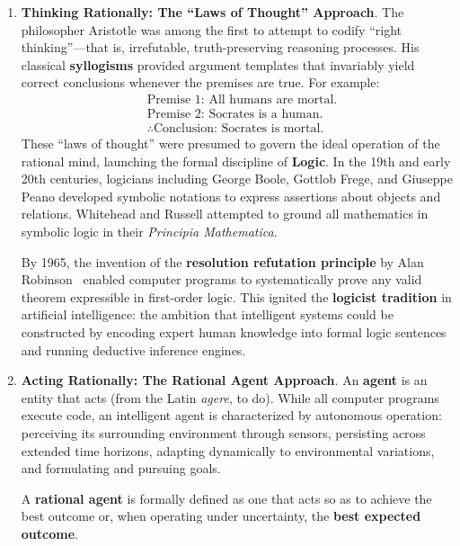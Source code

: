 \begin{enumerate}
  \item \textbf{Thinking Rationally: The ``Laws of Thought'' Approach}.
  The philosopher Aristotle was among the first to attempt to codify ``right thinking''---that is, irrefutable, truth-preserving reasoning processes. His classical \textbf{syllogisms} provided argument templates that invariably yield correct conclusions whenever the premises are true. For example:
  \begin{equation}
  \begin{aligned}
  &\text{Premise 1: All humans are mortal.} \\
  &\text{Premise 2: Socrates is a human.} \\
  &\therefore \text{Conclusion: Socrates is mortal.}
  \end{aligned}
  \end{equation}
  These ``laws of thought'' were presumed to govern the ideal operation of the rational mind, launching the formal discipline of \textbf{Logic}. In the 19th and early 20th centuries, logicians including George Boole, Gottlob Frege, and Giuseppe Peano developed symbolic notations to express assertions about objects and relations. Whitehead and Russell attempted to ground all mathematics in symbolic logic in their \emph{Principia Mathematica}.
  
  By 1965, the invention of the \textbf{resolution refutation principle} by Alan Robinson~\cite{robinson1965machine} enabled computer programs to systematically prove any valid theorem expressible in first-order logic. This ignited the \textbf{logicist tradition} in artificial intelligence: the ambition that intelligent systems could be constructed by encoding expert human knowledge into formal logic sentences and running deductive inference engines.

  \item \textbf{Acting Rationally: The Rational Agent Approach}.
  An \textbf{agent} is an entity that acts (from the Latin \emph{agere}, to do). While all computer programs execute code, an intelligent agent is characterized by autonomous operation: perceiving its surrounding environment through sensors, persisting across extended time horizons, adapting dynamically to environmental variations, and formulating and pursuing goals.
  
  A \textbf{rational agent} is formally defined as one that acts so as to achieve the best outcome or, when operating under uncertainty, the \textbf{best expected outcome}.
  

\end{enumerate}
